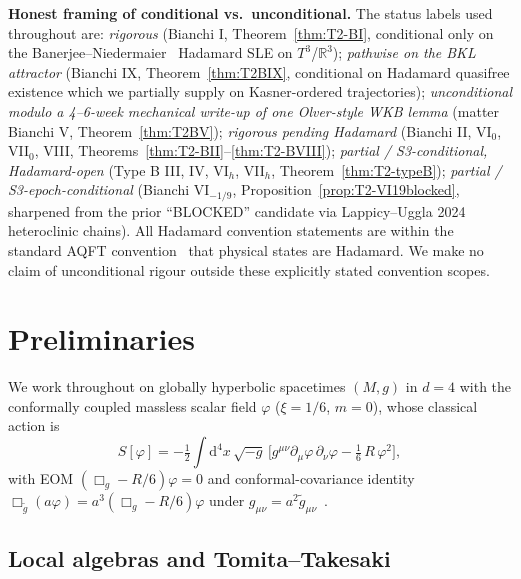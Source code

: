 \documentclass[11pt]{article}
\theoremstyle{definition}
\newcommand{\R}{\mathbb{R}}
\begin{document}
\medskip

\noindent\textbf{Honest framing of conditional vs.~unconditional.} The status labels used throughout are: \emph{rigorous} (Bianchi I, Theorem~\ref{thm:T2-BI}, conditional only on the Banerjee--Niedermaier~\cite{BanerjeeNiedermaier2023} Hadamard SLE on $T^3$/$\R^3$); \emph{pathwise on the BKL attractor} (Bianchi IX, Theorem~\ref{thm:T2BIX}, conditional on Hadamard quasifree existence which we partially supply on Kasner-ordered trajectories); \emph{unconditional modulo a 4--6-week mechanical write-up of one Olver-style WKB lemma} (matter Bianchi V, Theorem~\ref{thm:T2BV}); \emph{rigorous pending Hadamard} (Bianchi II, VI$_0$, VII$_0$, VIII, Theorems~\ref{thm:T2-BII}--\ref{thm:T2-BVIII}); \emph{partial / S3-conditional, Hadamard-open} (Type B III, IV, VI$_h$, VII$_h$, Theorem~\ref{thm:T2-typeB}); \emph{partial / S3-epoch-conditional} (Bianchi VI$_{-1/9}$, Proposition~\ref{prop:T2-VI19blocked}, sharpened from the prior ``BLOCKED'' candidate via Lappicy--Uggla 2024~\cite{LappicyUggla2024} heteroclinic chains). All Hadamard convention statements are within the standard AQFT convention~\cite{HollandsWald2001,BrunettiFredenhagenVerch2003,Verch1994} that physical states are Hadamard. We make no claim of unconditional rigour outside these explicitly stated convention scopes.

\section{Preliminaries}\label{sec:prelim}

We work throughout on globally hyperbolic spacetimes $(M,g)$ in $d=4$ with the conformally coupled massless scalar field $\varphi$ ($\xi=1/6$, $m=0$), whose classical action is~\cite[\S4.6]{Wald1994}
\begin{equation}\label{eq:S-cc}
S[\varphi] = -\tfrac{1}{2}\int \mathrm{d}^4 x\, \sqrt{-g}\,\Big[g^{\mu\nu}\partial_\mu\varphi\,\partial_\nu\varphi - \tfrac{1}{6}\,R\,\varphi^2\Big],
\end{equation}
with EOM $(\Box_g - R/6)\varphi=0$ and conformal-covariance identity $\Box_{\tilde g}(a\varphi) = a^3(\Box_g - R/6)\varphi$ under $g_{\mu\nu}=a^2\tilde g_{\mu\nu}$~\cite[\S4.6]{Wald1994}.

\subsection{Local algebras and Tomita--Takesaki}\label{sec:tomita}
\end{document}
